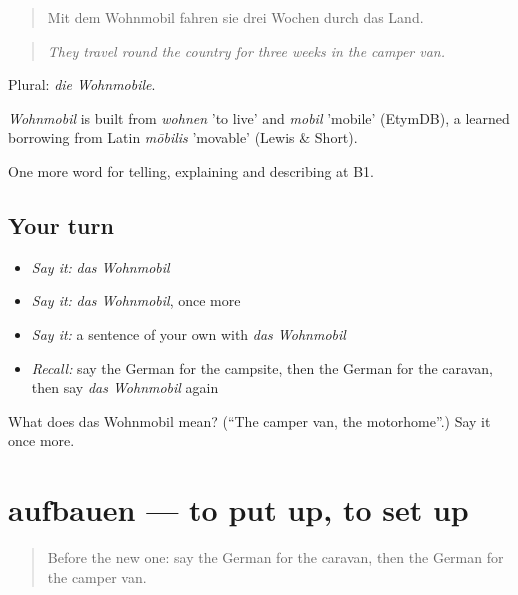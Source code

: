 \begin{quote}
Mit dem Wohnmobil fahren sie drei Wochen durch das Land.
\end{quote}

\begin{quote}
\emph{They travel round the country for three weeks in the camper van.}
\end{quote}

Plural: \emph{die Wohnmobile}.

\begin{cousinweb}
\emph{Wohnmobil} is built from \emph{wohnen} 'to live' and \emph{mobil} 'mobile' (EtymDB), a learned borrowing from Latin \emph{mōbilis} 'movable' (Lewis \& Short).
\end{cousinweb}

\begin{grammarlens}[title={What you've built}]
One more word for telling, explaining and describing at B1.
\end{grammarlens}

\subsection*{Your turn}
\begin{itemize}
\raggedright
  \item \emph{Say it:} \emph{das Wohnmobil}
  \item \emph{Say it:} \emph{das Wohnmobil}, once more
  \item \emph{Say it:} a sentence of your own with \emph{das Wohnmobil}
  \item \emph{Recall:} say the German for the campsite, then the German for the caravan, then say \emph{das Wohnmobil} again
\end{itemize}

\begin{tcolorbox}[breakable,colback=teal!4,colframe=teal!35!black,title={Before you move on}]
What does das Wohnmobil mean? (\textquotedblleft{}The camper van, the motorhome\textquotedblright{}.) Say it once more.
\end{tcolorbox}
\section[aufbauen]{aufbauen — to put up, to set up}

\label{lesson:GE-C425-aufbauen}



\begin{quote}
Before the new one: say the German for the caravan, then the German for the camper van.
\end{quote}

